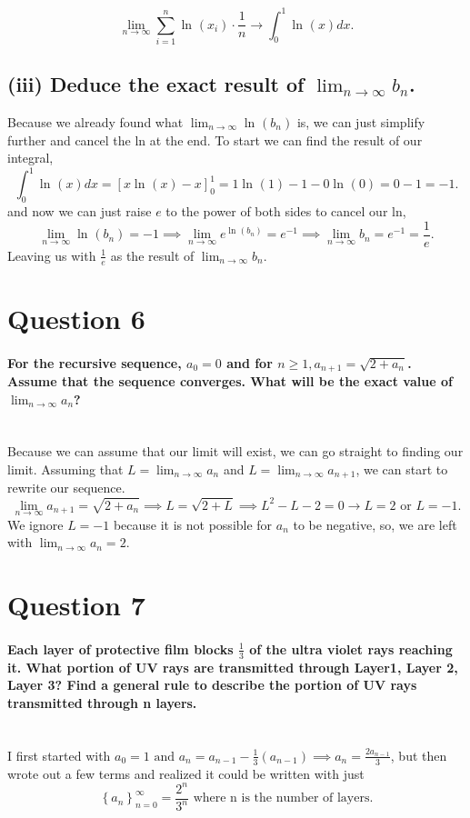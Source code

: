 \[
\lim_{ n \to \infty} \sum_{ i=1 } ^{ n } \ln^{  } \left( x_i \right) \cdot \frac{ 1 }{ n } \to \int_{ 0 }^{ 1 } \ln^{  } \left( x \right) dx
.\] 

\subsection*{(iii) Deduce the exact result of $ \lim_{ n \to \infty} b_n $.}%
Because we already found what $ \lim_{ n \to \infty} \ln^{  } \left( b_n \right)  $ is, we can just simplify further and cancel the ln at the end. To start we can find the result of our integral,
\[
\int_{ 0 }^{ 1 } \ln^{  } \left( x \right) dx = \left[ x\ln^{  } \left( x \right) -x \right] _{ 0 }^{ 1 } = 1\ln^{  } \left( 1 \right) -1-0\ln^{  } \left( 0 \right) = 0-1 = -1
.\] 
and now we can just raise $ e $ to the power of both sides to cancel our ln,
\[
\lim_{ n \to \infty} \ln^{  } \left( b_n \right) = -1 \implies \lim_{ n \to \infty} e^{ \ln^{  } \left( b_n \right)  }=e^{ -1 } \implies \lim_{ n \to \infty} b_n = e^{ -1 } = \frac{ 1 }{ e } 
.\] 
Leaving us with $ \frac{ 1 }{ e }  $ as the result of $ \lim_{ n \to \infty} b_n $.
\newpage
\section*{Question 6}%
\paragraph{For the recursive sequence, $ a_0 =0$ and for $ n\ge 1, a_{ n+1 }=\sqrt{ 2+ a_n} $. Assume that the sequence converges. What will be the exact value of $ \lim_{ n \to \infty} a_{ n } $? \\ \\ }
Because we can assume that our limit will exist, we can go straight to finding our limit. Assuming that $ L=\lim_{ n \to \infty} a_n $ and $ L=\lim_{ n \to \infty} a_{ n+1 } $, we can start to rewrite our sequence. 
\[
\lim_{ n \to \infty} a_{ n+1 } = \sqrt{ 2+a_n} \implies L = \sqrt{ 2+L } \implies L^2-L-2= 0 \to L=2 \text{ or } L=-1
.\] 
We ignore $ L=-1 $ because it is not possible for $ a_n $ to be negative, so, we are left with $ \lim_{ n \to \infty} a_n =2 $.

\section*{Question 7}%
\paragraph{Each layer of protective film blocks $ \frac{ 1 }{ 3 }  $ of the ultra violet rays reaching it. What portion of UV rays are transmitted through Layer1, Layer 2, Layer 3? Find a general rule to describe the portion of UV rays transmitted through n layers. \\ \\}
I first started with $ a_0 =1 \text{ and }a_n=a_{ n-1 }-\frac{ 1 }{ 3 } \left( a_{ n-1 } \right) \implies a_n= \frac{ 2a_{ n-1 } }{ 3 } $, but then wrote out a few terms and realized it could be written with just \[
\left\{ a_n \right\} _{ n=0 }^{ \infty }= \frac{ 2^{ n } }{ 3^{ n } }\text{ where n is the number of layers}
.\] 
